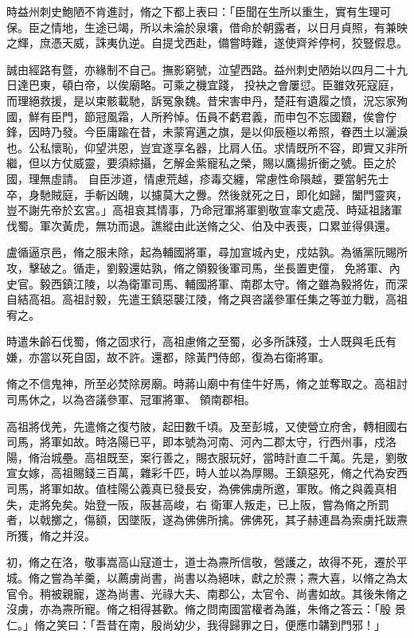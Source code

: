 \begin{pinyinscope}
 時益州刺史鮑陋不肯進討，脩之下都上表曰：「臣聞在生所以重生，實有生理可保。臣之情地，生途已竭，所以未淪於泉壤，借命於朝露者，以日月貞照，有兼映之輝，庶憑天威，誅夷仇逆。自提戈西赴，備嘗時難，遂使齊斧停柯，狡豎假息。



 誠由經路有暨，亦緣制不自己。撫影窮號，泣望西路。益州刺史陋始以四月二十九日達巴東，頓白帝，以俟廟略。可乘之機宜踐，
 投袂之會屢愆。臣雖效死寇庭，而理絕救援，是以束骸載馳，訴冤象魏。昔宋害申丹，楚莊有遺履之憤，況忘家殉國，鮮有臣門，節冠風霜，人所矜悼。伍員不虧君義，而申包不忘國艱，俟會佇鋒，因時乃發。今臣庸踰在昔，未蒙宵邁之旗，是以仰辰極以希照，眷西土以灑淚也。公私懷恥，仰望洪恩，豈宜遂享名器，比肩人伍。求情既所不容，即實又非所繼，但以方仗威靈，要須綜攝，乞解金紫寵私之榮，賜以鷹揚折衝之號。臣之於國，理無虛請。
 自臣涉道，情慮荒越，疹毒交纏，常慮性命隕越，要當躬先士卒，身馳賊庭，手斬凶醜，以攄莫大之釁。然後就死之日，即化如歸，闔門靈爽，豈不謝先帝於玄宮。」高祖哀其情事，乃命冠軍將軍劉敬宣率文處茂、時延祖諸軍伐蜀。軍次黃虎，無功而退。譙縱由此送脩之父、伯及中表喪，口累並得俱還。



 盧循逼京邑，脩之服未除，起為輔國將軍，尋加宣城內史，戍姑孰。為循黨阮賜所攻，擊破之。循走，劉毅還姑孰，脩之領毅後軍司馬，坐長置吏僮，
 免將軍、內史官。毅西鎮江陵，以為衛軍司馬、輔國將軍、南郡太守。脩之雖為毅將佐，而深自結高祖。高祖討毅，先遣王鎮惡襲江陵，脩之與咨議參軍任集之等並力戰，高祖宥之。



 時遣朱齡石伐蜀，脩之固求行，高祖慮脩之至蜀，必多所誅殘，士人既與毛氏有嫌，亦當以死自固，故不許。還都，除黃門侍郎，復為右衛將軍。



 脩之不信鬼神，所至必焚除房廟。時蔣山廟中有佳牛好馬，脩之並奪取之。高祖討司馬休之，以為咨議參軍、冠軍將軍、
 領南郡相。



 高祖將伐羌，先遣脩之復芍陂，起田數千頃。及至彭城，又使營立府舍，轉相國右司馬，將軍如故。時洛陽已平，即本號為河南、河內二郡太守，行西州事，戍洛陽，脩治城壘。高祖既至，案行善之，賜衣服玩好，當時計直二千萬。先是，劉敬宣女嫁，高祖賜錢三百萬，雜彩千匹，時人並以為厚賜。王鎮惡死，脩之代為安西司馬，將軍如故。值桂陽公義真已發長安，為佛佛虜所邀，軍敗。脩之與義真相失，走將免矣。始登一阪，阪甚高峻，右
 衛軍人叛走，已上阪，嘗為脩之所罰者，以戟擲之，傷額，因墜阪，遂為佛佛所擒。佛佛死，其子赫連昌為索虜托跋燾所獲，脩之并沒。



 初，脩之在洛，敬事嵩高山寇道士，道士為燾所信敬，營護之，故得不死，遷於平城。脩之嘗為羊羹，以薦虜尚書，尚書以為絕味，獻之於燾；燾大喜，以脩之為太官令。稍被親寵，遂為尚書、光祿大夫、南郡公，太官令、尚書如故。其後朱脩之沒虜，亦為燾所寵。脩之相得甚歡。脩之問南國當權者為誰，朱脩之答云：「殷
 景仁。」脩之笑曰：「吾昔在南，殷尚幼少，我得歸罪之日，便應巾韝到門邪！」




\end{pinyinscope}
